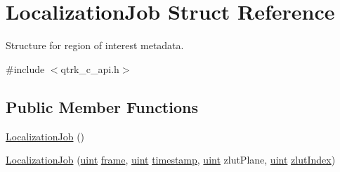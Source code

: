 \hypertarget{struct_localization_job}{}\section{Localization\+Job Struct Reference}
\label{struct_localization_job}


Structure for region of interest metadata.  




{\ttfamily \#include $<$qtrk\+\_\+c\+\_\+api.\+h$>$}

\subsection*{Public Member Functions}
\begin{DoxyCompactItemize}
\item 
\hyperlink{struct_localization_job_a6d5cf048c3b2c413e58606d7d4ad0d29}{Localization\+Job} ()
\item 
\hyperlink{struct_localization_job_adf9c896abcf6033625d92943f0ce260f}{Localization\+Job} (\hyperlink{std__incl_8h_a91ad9478d81a7aaf2593e8d9c3d06a14}{uint} \hyperlink{struct_localization_job_a54df1ba33ab48b20dca664142a8cf619}{frame}, \hyperlink{std__incl_8h_a91ad9478d81a7aaf2593e8d9c3d06a14}{uint} \hyperlink{struct_localization_job_a82f4cdb35dd3b6765df52dd045007286}{timestamp}, \hyperlink{std__incl_8h_a91ad9478d81a7aaf2593e8d9c3d06a14}{uint} zlut\+Plane, \hyperlink{std__incl_8h_a91ad9478d81a7aaf2593e8d9c3d06a14}{uint} \hyperlink{struct_localization_job_afcf9f91b72597af0e2572f3ae74d9a99}{zlut\+Index})
\end{DoxyCompactItemize}
